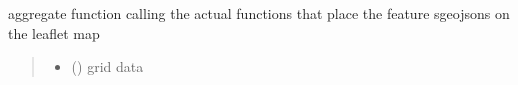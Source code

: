 \documentclass[letterpaper,10pt,english]{sphinxmanual}
\begin{document}

\begin{fulllineitems}
\label{\detokenize{docs_gui/js_api/urbs_results/setup_urbs_results:displayUrbsNet}}
\pysigstartsignatures
{}
\pysigstopsignatures
\sphinxAtStartPar
aggregate function calling the actual functions that place the feature sgeojsons on the leaflet map
\begin{quote}\begin{description}
\begin{itemize}
\item {} 
\sphinxAtStartPar
{} () \textendash{} grid data

\end{itemize}

\end{description}\end{quote}

\end{fulllineitems}

\end{document}
